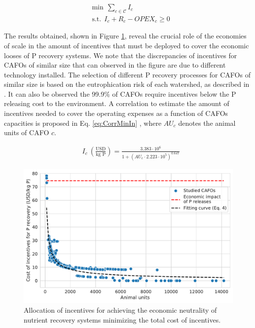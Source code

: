 \begin{refsection}[referencesCh5]
\begin{subequations}
	\begin{align}
	& \text{min} \ \ \sum_{c \in \mathcal{C}} I_{c}  \label{eq:objMinIn} \\
	& \text{s.t.} \ \ I_{c} + R_{c} - OPEX_{c} \geq 0 \label{eq:cons1MinIn}
	\end{align}
\end{subequations}

The results obtained, shown in Figure \ref{fig:MinIncent}, reveal the crucial role of the economies of scale in the amount of incentives that must be deployed to cover the economic looses of P recovery systems. We note that the discrepancies of incentives for CAFOs of similar size that can observed in the figure are due to different technology installed. The selection of different P recovery processes for CAFOs of similar size is based on the eutrophication risk of each watershed, 
as described in \citet{Tool}.
It can also be observed the 99.9\% of CAFOs require incentives below the P releasing cost to the environment. A correlation to estimate the amount of incentives needed to cover the operating expenses as a function of CAFOs capacities is proposed in Eq. \ref{eq:CorrMinIn} , where $AU_{c}$ denotes the animal units of CAFO $c$.

\begin{align}
& I_{c} \ \left(\frac{\text{USD}}{\text{kg P}}\right) = \frac{3.383 \cdot 10^6}{1+\left(AU_{c} \cdot 2.223\cdot 10^5 \right)^{0.647}} \label{eq:CorrMinIn} 
\end{align}

\begin{figure}[h!]
	\centering
	\includegraphics[width=0.9\linewidth, trim=0cm 0cm 0cm 0cm, clip]{gfx/Chapter5/MinIncent.pdf}
	\caption{Allocation of incentives for achieving the economic neutrality of nutrient recovery systems minimizing the total cost of incentives.}
	\label{fig:MinIncent}
\end{figure}


\end{refsection}
